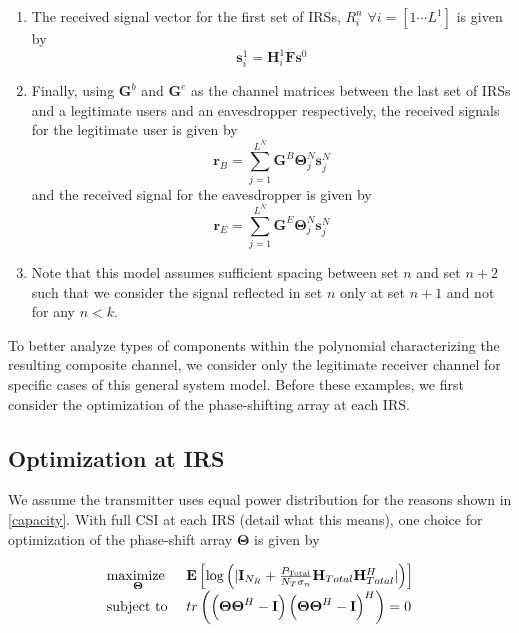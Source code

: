 \documentclass[12pt,a4paper]{report}
\begin{document}
\begin{enumerate}
\item 
The received signal vector for the first set of IRSs, $R^n_{i}$ $\forall i = [1 \cdots L^{1}]$ is given by 
\begin{equation}
\mathbf{s}^{1}_{i} = \mathbf{H}^{1}_{i}\mathbf{F}\mathbf{s}^0
\end{equation}
\item 
	Finally, using $\mathbf{G}^b$ and $\mathbf{G}^e$ as the channel matrices between the last set of IRSs and a legitimate users and an eavesdropper respectively, the received signals for the legitimate user is given by 
	\begin{equation}\label{legit_received}
\mathbf{r}_{B} = \sum_{j = 1}^{L^{N}}\mathbf{G}^{B}\boldsymbol{\Theta}^{N}_{j}\mathbf{s}^{N}_{j}
\end{equation}
	and the received signal for the eavesdropper is given by 
	\begin{equation}\label{tap_received}
\mathbf{r}_{E} = \sum_{j = 1}^{L^{N}} \mathbf{G}^{E}\boldsymbol{\Theta}^{N}_{j}\mathbf{s}^{N}_{j}
\end{equation}
\item
	Note that this model assumes sufficient spacing between set $n$ and set $n+2$ such that we consider the signal reflected in set $n$ only at set $n+1$ and not for any $n<k$.

\end{enumerate}
To better analyze types of components within the polynomial characterizing the resulting composite channel, we consider only the legitimate receiver channel for specific cases of this general system model. Before these examples, we first consider the optimization of the phase-shifting array at each IRS.

\subsection{Optimization at IRS}
We assume the transmitter uses equal power distribution for the reasons shown in \ref{capacity}. With full CSI at each IRS (detail what this means), one choice for optimization of the phase-shift array $\boldsymbol{\Theta}$ is given by 

    \begin{equation}
    \begin{array}{ll}
    \underset{\boldsymbol{\Theta}}{\text{maximize }}   & \mathop{\bf E{}}\left[\text{log{}}\left(|\mathbf{I}_{N_R}+\frac{P_{\text{Total}}}{N_T \sigma_n}\mathbf{H}_{Total}\mathbf{H}_{Total}^H|\right)\right]
    \\
    \mbox{subject to } & tr\left(
    \left(\boldsymbol{\Theta}\boldsymbol{\Theta}^H - \mathbf{I}  \right)
    \left(\boldsymbol{\Theta}\boldsymbol{\Theta}^H - \mathbf{I}  \right)^H
    \right) = 0
    \end{array}
    \label{general_irs_opt}
    \end{equation}
\end{document}
